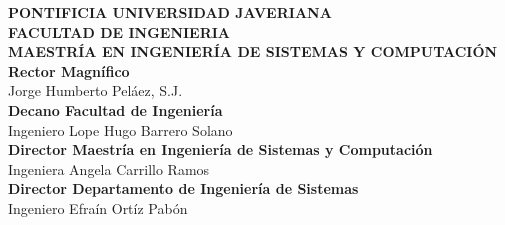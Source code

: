 \thispagestyle{empty}

\begin{center}

		\fontsize{12pt}{12pt}\textbf{PONTIFICIA UNIVERSIDAD JAVERIANA\\
		FACULTAD DE INGENIERIA\\
		MAESTRÍA EN INGENIERÍA DE SISTEMAS Y COMPUTACIÓN}\\
        \vspace*{10cm}
		\fontsize{12pt}{12pt}\selectfont \textbf{Rector Magnífico}\\
		\vspace{0.2cm}
        Jorge Humberto Peláez, S.J.\\
        \vspace{0.2cm}
        \textbf{Decano Facultad de Ingeniería}\\
        \vspace{0.2cm}
        Ingeniero Lope Hugo Barrero Solano\\
        \vspace{0.2cm}
        \textbf{Director Maestría en Ingeniería de Sistemas y Computación}\\
        \vspace{0.2cm}
        Ingeniera Angela Carrillo Ramos\\
        \vspace{0.2cm}
        \textbf{Director Departamento de Ingeniería de Sistemas}\\
        \vspace{0.2cm}
        Ingeniero Efraín Ortíz Pabón\\
        
\end{center}
